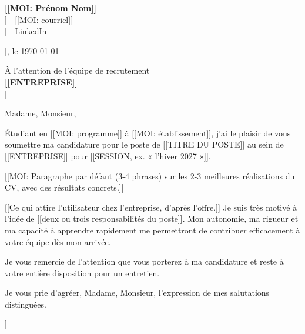 \documentclass[letterpaper,11pt]{article}
\begin{document}
\begin{flushleft}
    \textbf{\Large [[MOI: Prénom Nom]]} \\
    [[MOI: téléphone]] $|$ \href{mailto:[[MOI: courriel]]}{[[MOI: courriel]]} \\
    [[MOI: Ville, QC]] $|$ \href{[[MOI: URL LinkedIn]]}{\underline{LinkedIn}}
\end{flushleft}

\vspace{20pt}

\begin{flushright}
    [[MOI: Ville]], le \today
\end{flushright}

\vspace{10pt}

\begin{flushleft}
    À l'attention de l'équipe de recrutement \\
    \textbf{[[ENTREPRISE]]} \\
    [[VILLE, PROVINCE]]
\end{flushleft}

\vspace{20pt}

Madame, Monsieur,

\vspace{10pt}

Étudiant en [[MOI: programme]] à [[MOI: établissement]], j'ai le plaisir de vous soumettre ma candidature pour le poste de [[TITRE DU POSTE]] au sein de [[ENTREPRISE]] pour [[SESSION, ex. « l'hiver 2027 »]].

\vspace{10pt}

[[MOI: Paragraphe par défaut (3-4 phrases) sur les 2-3 meilleures réalisations du CV, avec des résultats concrets.]]

\vspace{10pt}

[[Ce qui attire l'utilisateur chez l'entreprise, d'après l'offre.]] Je suis très motivé à l'idée de [[deux ou trois responsabilités du poste]]. Mon autonomie, ma rigueur et ma capacité à apprendre rapidement me permettront de contribuer efficacement à votre équipe dès mon arrivée.

\vspace{10pt}

Je vous remercie de l'attention que vous porterez à ma candidature et reste à votre entière disposition pour un entretien.

\vspace{20pt}

Je vous prie d'agréer, Madame, Monsieur, l'expression de mes salutations distinguées.

\vspace{30pt}

\noindent [[MOI: Prénom Nom]]
\end{document}
